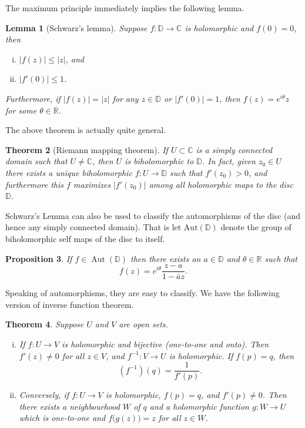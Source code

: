 \documentclass[12pt,openany]{book}
\newcommand{\sabs}[1]{\lvert {#1} \rvert}
\newcommand{\C}{{\mathbb{C}}}
\newcommand{\R}{{\mathbb{R}}}
\newcommand{\D}{{\mathbb{D}}}
\theoremstyle{plain}
\newtheorem{thm}{Theorem}[section]
\newtheorem{lemma}[thm]{Lemma}
\newtheorem{prop}[thm]{Proposition}
\theoremstyle{remark}
\theoremstyle{definition}
\theoremstyle{exercise}
\theoremstyle{example}
\begin{document}
The maximum principle immediately implies the following lemma.

\pagebreak[2]

\begin{lemma}[Schwarz's lemma]
Suppose $f \colon \D \to \C$ is holomorphic and $f(0) = 0$,
then 
\begin{enumerate}[(i)]
\item $\sabs{f(z)} \leq \sabs{z}$, and
\item $\sabs{f'(0)} \leq 1$.
\end{enumerate}
Furthermore, if $\sabs{f(z)} = \sabs{z}$ for any $z \in \D$
or $\sabs{f'(0)} = 1$, then $f(z) =
e^{i\theta} z$ for some $\theta \in \R$.
\end{lemma}

The above theorem is actually quite general.

\begin{thm}[Riemann mapping theorem]
If $U \subset \C$ is a simply connected domain such that $U \neq \C$,
then $U$ is biholomorphic to $\D$.  In fact, given $z_0 \in U$
there exists a unique biholomorphic $f \colon U \to \D$
such that $f'(z_0) > 0$, and furthermore this $f$
maximizes $\sabs{f'(z_0)}$ among all holomorphic maps to the disc $\D$.
\end{thm}

Schwarz's Lemma can also be used to classify the automorphisms of the disc
(and hence any simply connected domain).  That is let
$\operatorname{Aut(\D)}$ denote the group of biholomorphic self maps of the
disc to itself.

\begin{prop}
If $f \in \operatorname{Aut}(\D)$ then there exists an $a \in \D$
and $\theta \in \R$ such that
\begin{equation*}
f(z) = e^{i\theta} \frac{z-a}{1-\bar{a}z} .
\end{equation*}
\end{prop}

Speaking of automorphisms, they are easy to classify.  We have the following
version of inverse function theorem.

\begin{thm}
Suppose $U$ and $V$ are open sets.
\begin{enumerate}[(i)]
\item
If $f \colon U \to V$ is holomorphic and bijective (one-to-one and onto).
Then $f'(z) \not= 0$ for all $z \in V$, and $f^{-1} \colon V \to U$
is holomorphic.  If $f(p) = q$, then
\begin{equation*}
\left(f^{-1}\right)(q) = \frac{1}{f'(p)} .
\end{equation*}
\item
Conversely, if $f \colon U \to V$ is holomorphic, $f(p) = q$,
and $f'(p) \not= 0$.  Then there exists a neighbourhood $W$ of $q$
and a holomorphic function $g \colon W \to U$ which is
one-to-one and $f\bigl(g(z)\bigr) = z$ for all $z \in W$.
\end{enumerate}
\end{thm}
\end{document}

